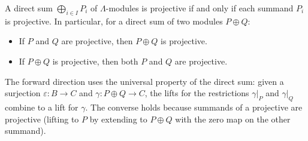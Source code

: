 A direct sum $\bigoplus_{i \in I} P_i$ of $\Lambda$-modules is projective if and only if each summand $P_i$ is projective. In particular, for a direct sum of two modules $P \oplus Q$:

\begin{itemize}
\item If $P$ and $Q$ are projective, then $P \oplus Q$ is projective.
\item If $P \oplus Q$ is projective, then both $P$ and $Q$ are projective.
\end{itemize}

The forward direction uses the universal property of the direct sum: given a surjection $\varepsilon : B \rightarrow C$ and $\gamma : P \oplus Q \rightarrow C$, the lifts for the restrictions $\gamma|_P$ and $\gamma|_Q$ combine to a lift for $\gamma$. The converse holds because summands of a projective are projective (lifting to $P$ by extending to $P \oplus Q$ with the zero map on the other summand).
